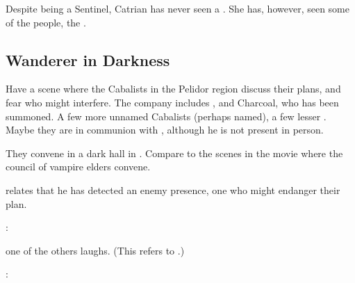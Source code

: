 \begin{garbage}
Despite being a Sentinel, Catrian has never seen a \dragon. She has, however, seen some of the \draconian{} people, the \rachyth. 







\subsection{Wanderer in Darkness}
Have a scene where the Cabalists in the Pelidor region discuss their plans, and fear who might interfere. The company includes \Teshrial, \Achsah{} and Charcoal, who has been summoned. A few more unnamed Cabalists (perhaps named), a few lesser \banes{}. Maybe they are in communion with \Azraid{}, although he is not present in person. 

They convene in a dark hall in \Nyx. Compare to the scenes in the movie \cite{Movie:Blade} where the council of vampire elders convene. 


\Teshrial{} relates that he has detected an enemy presence, one who might endanger their plan. 


\Teshrial: 

 one of the others laughs.  (This refers to \Secherdamon.)

\Teshrial: 



\end{garbage}
